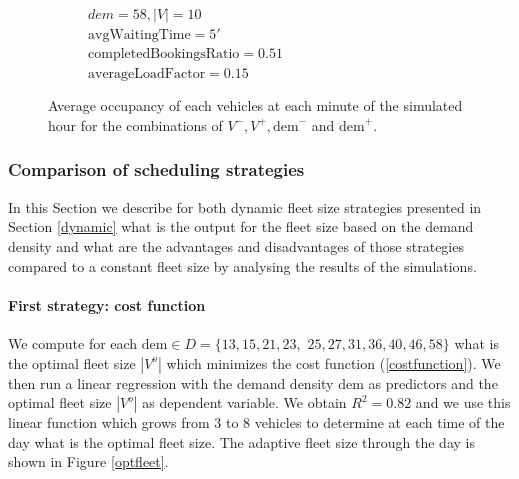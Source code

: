 \documentclass[12pt,a4paper]{article}
\begin{document}
\begin{figure}[]
\begin{subfigure}[b]{0.48\textwidth}
  \caption{$dem = 58, |V| = 10$\\ $\text{avgWaitingTime} = 5'$\\ $\text{completedBookingsRatio} = 0.51$ \\ $\text{averageLoadFactor} = 0.15$}
  \label{dem58v10}
\end{subfigure}
\caption{Average occupancy of each vehicles at each minute of the simulated hour for the combinations of $V^{-}, V^{+}, \text{dem}^{-}$ and $\text{dem}^{+}$.}
\label{extremesimu}
\end{figure}

\subsubsection{Comparison of scheduling strategies}\label{comparedynamic}
In this Section we describe for both dynamic fleet size strategies presented in Section \ref{dynamic} what is the output for the fleet size based on the demand density and what are the advantages and disadvantages of those strategies compared to a constant fleet size by analysing the results of the simulations.
\paragraph{First strategy: cost function}
We compute for each $\text{dem} \in D =  \{13, 15, 21, 23,$ $25, 27, 31, 36, 40, 46, 58\}$ what is the optimal fleet size $|V^{o}|$ which minimizes the cost function (\ref{costfunction}). We then run a linear regression with the demand density $\text{dem}$ as predictors and the optimal fleet size $|V^{o}|$ as dependent variable. We obtain $R^{2} = 0.82$ and we use this linear function which grows from 3 to 8 vehicles to determine at each time of the day what is the optimal fleet size. The adaptive fleet size through the day is shown in Figure \ref{optfleet}.
  
\end{document}
